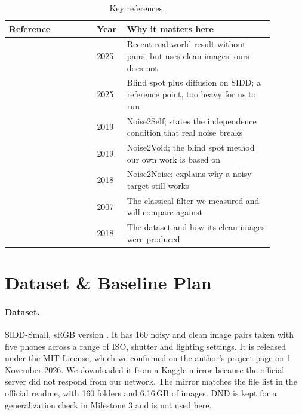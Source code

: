 \documentclass[11pt]{article}
\begin{document}
\begin{table}[ht]
\centering
\caption{Key references.}
\label{tab:refs}
\begin{tabular}{@{}p{0.30\linewidth}p{0.08\linewidth}p{0.50\linewidth}@{}}
\toprule
\textbf{Reference} & \textbf{Year} & \textbf{Why it matters here} \\
\midrule
\citet{chihaoui2025sparsity}   & 2025 & Recent real-world result without pairs, but uses clean images; ours does not \\
\citet{cheng2025blindspot}     & 2025 & Blind spot plus diffusion on SIDD; a reference point, too heavy for us to run \\
\citet{batson2019noise2self}   & 2019 & Noise2Self; states the independence condition that real noise breaks \\
\citet{krull2019noise2void}    & 2019 & Noise2Void; the blind spot method our own work is based on \\
\citet{lehtinen2018noise2noise}& 2018 & Noise2Noise; explains why a noisy target still works \\
\citet{dabov2007bm3d}          & 2007 & The classical filter we measured and will compare against \\
\citet{abdelhamed2018sidd}     & 2018 & The dataset and how its clean images were produced \\
\bottomrule
\end{tabular}
\end{table}

\section{Dataset \& Baseline Plan}
\label{sec:data}

\paragraph{Dataset.}
SIDD-Small, sRGB version \citep{abdelhamed2018sidd}. It has 160 noisy and clean image
pairs taken with five phones across a range of ISO, shutter and lighting settings. It is
released under the MIT License, which we confirmed on the author's project page on
1 November 2026. We downloaded it from a Kaggle mirror because the official server did not
respond from our network. The mirror matches the file list in the official readme, with
160 folders and 6.16\,GB of images. DND \citep{plotz2017dnd} is kept for a generalization
check in Milestone 3 and is not used here.
\end{document}
